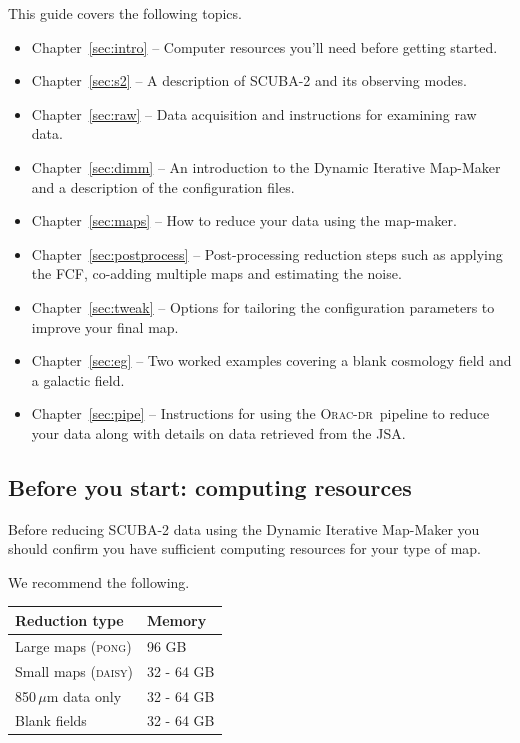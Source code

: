 \documentclass[twoside,11pt]{article}
\newcommand{\htmladdnormallink}[2]{#1}
\newcommand{\htmlref}[2]{#1}
\newcommand{\latexhtml}[2]{#1}
\newcommand{\xlabel}[1]{}
\renewcommand{\_}{\texttt{\symbol{95}}}
\newcommand{\oracdr}{\htmladdnormallink{\textsc{Orac-dr}}{http://www.oracdr.org/oracdr}}
\newcommand{\cref}[3]{\latexhtml{#1~\ref{#2}}{\htmlref{#3}{#2}}}
\begin{document}
This guide covers the following topics.
\begin{itemize}
\itemsep0em
\item \cref{Chapter}{sec:intro}{Chapter 1} -- Computer resources you'll need before getting started.
\item \cref{Chapter}{sec:s2}{Chapter 2} -- A description of SCUBA-2 and its observing modes.
\item \cref{Chapter}{sec:raw}{Chapter 3}  -- Data acquisition and instructions for examining raw data.
\item \cref{Chapter}{sec:dimm}{Chapter 4}  -- An introduction to the Dynamic Iterative Map-Maker and a description of the configuration files.
\item \cref{Chapter}{sec:maps}{Chapter 5}  -- How to reduce your data using the map-maker.
\item \cref{Chapter}{sec:postprocess}{Chapter 6}  -- Post-processing reduction steps such as applying the FCF, co-adding multiple maps and estimating the noise.
\item \cref{Chapter}{sec:tweak}{Chapter 7}  -- Options for tailoring the configuration parameters to improve your final map.
\item \cref{Chapter}{sec:eg}{Chapter 8}  -- Two worked examples covering a \htmlref{blank cosmology field}{sec:cosmology} and a \htmlref{galactic field}{sec:bright_ex}.
\item \cref{Chapter}{sec:pipe}{Chapter 9}  -- Instructions for using the \oracdr\ pipeline to reduce your data along with details on data retrieved from the JSA.
\end{itemize}

\subsection{\xlabel{computing}Before you start: computing resources}

Before reducing SCUBA-2 data using the Dynamic Iterative Map-Maker you should
 confirm you have sufficient computing resources for your type of map.

We recommend the following.\\
\begin{table}[h!]
\centering
\begin{tabular}{ll}
\hline
\textbf{Reduction type} &\textbf{Memory} \\
\hline
Large maps (\textsc{pong})& 96 GB\\
Small maps (\textsc{daisy})&32 - 64 GB\\
850\,$\mu$m data only&32 - 64 GB\\
Blank fields&32 - 64 GB\\
\hline
\end{tabular}
\end{table}
\end{document}
